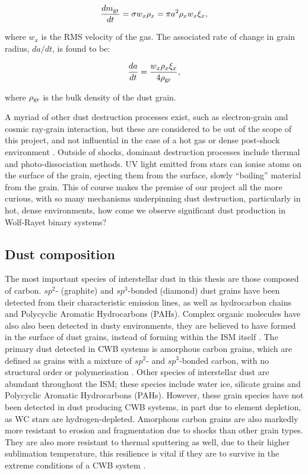 \begin{equation}
  \frac{dm_\text{gr}}{dt} = \sigma w_{x} \rho_{x} = \pi a^2 \rho_{x} w_{x} \xi_{x} ,
\end{equation}

\noindent
where $w_x$ is the RMS velocity of the gas.
The associated rate of change in grain radius, $da/dt$, is found to be:

\begin{equation}
  \frac{da}{dt} = \frac{w_x \rho_x \xi_x}{4 \rho_\text{gr}},
\end{equation}

\noindent
where $\rho_\text{gr}$ is the bulk density of the dust grain.

A myriad of other dust destruction processes exist, such as electron-grain and cosmic ray-grain interaction, but these are considered to be out of the scope of this project, and not influential in the case of a hot gas or dense post-shock environment
\parencite{jonesDustDestructionProcesses2004}.
Outside of shocks, dominant destruction processes include thermal and photo-dissociation methods.
UV light emitted from stars can ionise atoms on the surface of the grain, ejecting them from the surface, slowly ``boiling'' material from the grain.
This of course makes the premise of our project all the more curious, with so many mechanisms underpinning dust destruction, particularly in hot, dense environments, how come we observe significant dust production in Wolf-Rayet binary systems?

\subsection{Dust composition}

The most important species of interstellar dust in this thesis are those composed of carbon.
$sp^2$- (graphite) and $sp^3$-bonded (diamond) dust grains have been detected from their characteristic emission lines, as well as hydrocarbon chains and Polycyclic Aromatic Hydrocarbons (PAHs).
Complex organic molecules have also also been detected in dusty environments, they are believed to have formed in the surface of dust grains, instead of forming within the ISM itself
\parencite{herbstComplexOrganicInterstellar2009}.
The primary dust detected in CWB systems is amorphous carbon grains, which are defined as grains with a mixture of $sp^2$- and $sp^3$-bonded carbon, with no structural order or polymerisation
\parencite{draineInterstellarDustGrains2003}.
Other species of interstellar dust are abundant throughout the ISM; these species include water ice, silicate grains and Polycyclic Aromatic Hydrocarbons (PAHs).
However, these grain species have not been detected in dust producing CWB systems, in part due to element depletion, as WC stars are hydrogen-depleted.
Amorphous carbon grains are also markedly more resistant to erosion and fragmentation due to shocks than other grain types.
They are also more resistant to thermal sputtering as well, due to their higher sublimation temperature, this resilience is vital if they are to survive in the extreme conditions of a CWB system
\parencite{draineDestructionMechanismsInterstellar1979}.

